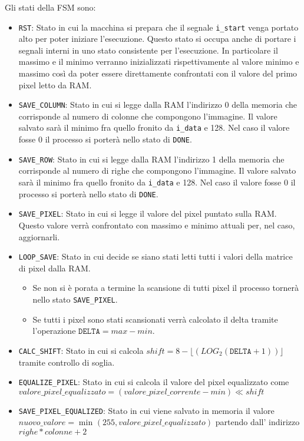 \documentclass{article}
\begin{document}
Gli stati della FSM sono:

\begin{itemize}
\item \texttt{RST}: Stato in cui la macchina si prepara che il segnale \texttt{i\_start} venga portato alto per poter iniziare l'esecuzione. Questo stato si occupa anche di portare i segnali interni in uno stato consistente per l'esecuzione. In particolare il massimo e il minimo verranno inizializzati rispettivamente al valore minimo e massimo così da poter essere direttamente confrontati con il valore del primo pixel letto da RAM.
\item \texttt{SAVE\_COLUMN}: Stato in cui si legge dalla RAM l'indirizzo 0 della memoria che corrisponde al numero di colonne che compongono l'immagine. Il valore salvato sarà il minimo fra quello fronito da \texttt{i\_data} e 128. Nel caso il valore fosse 0 il processo si porterà nello stato di \texttt{DONE}.
\item \texttt{SAVE\_ROW}: Stato in cui si legge dalla RAM l'indirizzo 1 della memoria che corrisponde al numero di righe che compongono l'immagine. Il valore salvato sarà il minimo fra quello fronito da \texttt{i\_data} e 128. Nel caso il valore fosse 0 il processo si porterà nello stato di \texttt{DONE}.
\item \texttt{SAVE\_PIXEL}: Stato in cui si legge il valore del pixel puntato sulla RAM. Questo valore verrà confrontato con massimo e minimo attuali per, nel caso, aggiornarli.
\item \texttt{LOOP\_SAVE}: Stato in cui decide se siano stati letti tutti i valori della matrice di pixel dalla RAM.
\begin{itemize}
    \item Se non si è porata a termine la scansione di tutti pixel il processo tornerà nello stato \texttt{SAVE\_PIXEL}.
    \item Se tutti i pixel sono stati scansionati verrà calcolato il delta tramite l'operazione \(\texttt{DELTA} = max - min\).
\end{itemize}
\item \texttt{CALC\_SHIFT}: Stato in cui si calcola \(shift = 8-  {\lfloor}(LOG_2(\texttt{DELTA} +1)){\rfloor}\) tramite controllo di soglia.
\item \texttt{EQUALIZE\_PIXEL}: Stato in cui si calcola il valore del pixel equalizzato come \(valore\_pixel\_equalizzato = (valore\_pixel\_corrente - min) \ll shift\)
\item \texttt{SAVE\_PIXEL\_EQUALIZED}: Stato in cui viene salvato in memoria il valore \(nuovo\_valore = \min_{} (255, valore\_pixel\_equalizzato)\) partendo dall' indirizzo \(righe * colonne + 2\)

\end{itemize}
\end{document}

